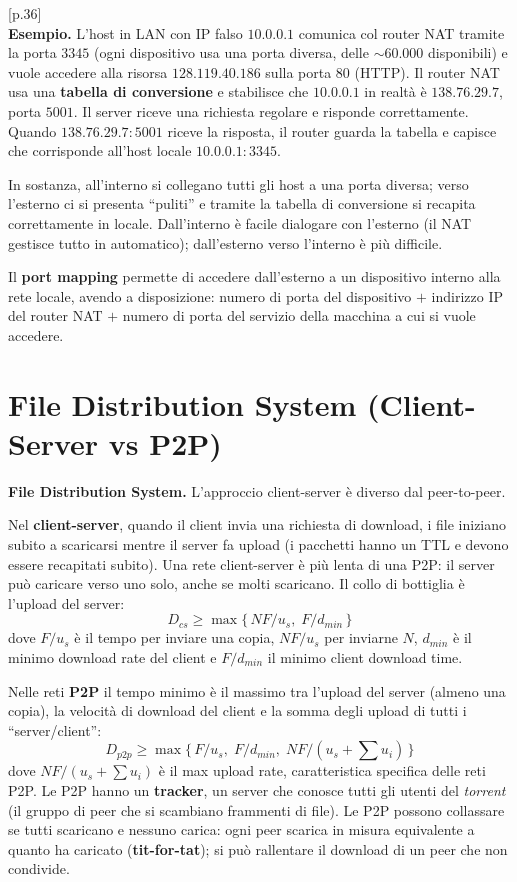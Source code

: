 \documentclass[11pt,a4paper]{report}
\newcommand{\pagemark}[1]{\marginpar{\footnotesize\color{gray}p.#1}}
\begin{document}
\noindent\hfill{\footnotesize\color{gray}[p.36]}\\
\textbf{Esempio.} L'host in LAN con IP falso $10.0.0.1$ comunica col router NAT tramite la porta $3345$ (ogni dispositivo usa una porta diversa, delle $\sim$60.000 disponibili) e vuole accedere alla risorsa $128.119.40.186$ sulla porta 80 (HTTP). Il router NAT usa una \textbf{tabella di conversione} e stabilisce che $10.0.0.1$ in realtà è $138.76.29.7$, porta $5001$. Il server riceve una richiesta regolare e risponde correttamente. Quando $138.76.29.7{:}5001$ riceve la risposta, il router guarda la tabella e capisce che corrisponde all'host locale $10.0.0.1{:}3345$.

In sostanza, all'interno si collegano tutti gli host a una porta diversa; verso l'esterno ci si presenta ``puliti'' e tramite la tabella di conversione si recapita correttamente in locale. Dall'interno è facile dialogare con l'esterno (il NAT gestisce tutto in automatico); dall'esterno verso l'interno è più difficile.

Il \textbf{port mapping} permette di accedere dall'esterno a un dispositivo interno alla rete locale, avendo a disposizione: numero di porta del dispositivo $+$ indirizzo IP del router NAT $+$ numero di porta del servizio della macchina a cui si vuole accedere.

\section{File Distribution System (Client-Server vs P2P)}\pagemark{37}
\textbf{File Distribution System.} L'approccio client-server è diverso dal peer-to-peer.

Nel \textbf{client-server}, quando il client invia una richiesta di download, i file iniziano subito a scaricarsi mentre il server fa upload (i pacchetti hanno un TTL e devono essere recapitati subito). Una rete client-server è più lenta di una P2P: il server può caricare verso uno solo, anche se molti scaricano. Il collo di bottiglia è l'upload del server:
\[ D_{cs} \ge \max\{\, NF/u_s,\; F/d_{min} \,\} \]
dove $F/u_s$ è il tempo per inviare una copia, $NF/u_s$ per inviarne $N$, $d_{min}$ è il minimo download rate del client e $F/d_{min}$ il minimo client download time.

Nelle reti \textbf{P2P} il tempo minimo è il massimo tra l'upload del server (almeno una copia), la velocità di download del client e la somma degli upload di tutti i ``server/client'':
\[ D_{p2p} \ge \max\{\, F/u_s,\; F/d_{min},\; NF/(u_s + \textstyle\sum u_i) \,\} \]
dove $NF/(u_s+\sum u_i)$ è il max upload rate, caratteristica specifica delle reti P2P. Le P2P hanno un \textbf{tracker}, un server che conosce tutti gli utenti del \emph{torrent} (il gruppo di peer che si scambiano frammenti di file). Le P2P possono collassare se tutti scaricano e nessuno carica: ogni peer scarica in misura equivalente a quanto ha caricato (\textbf{tit-for-tat}); si può rallentare il download di un peer che non condivide.
\end{document}
